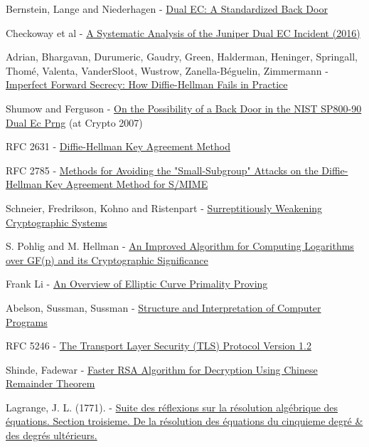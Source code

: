 \documentclass[a4paper,11pt,twocolumn]{article}
\begin{document}
\begin{thebibliography}{1}

 Bernstein, Lange and Niederhagen - \href{https://eprint.iacr.org/2015/767.pdf}{Dual EC: A Standardized Back Door}

 Checkoway et al - \href{http://eprint.iacr.org/2016/376}{A Systematic Analysis of the Juniper Dual EC Incident (2016)}

 Adrian, Bhargavan, Durumeric, Gaudry, Green, Halderman, Heninger, Springall, Thomé, Valenta,  VanderSloot, Wustrow, Zanella-Béguelin, Zimmermann -  \href{https://weakdh.org/imperfect-forward-secrecy-ccs15.pdf}{Imperfect Forward Secrecy: How Diffie-Hellman Fails in Practice}

 Shumow and Ferguson - \href{http://rump2007.cr.yp.to/15-shumow.pdf}{On the Possibility of a Back Door in the NIST SP800-90 Dual Ec Prng} (at Crypto 2007)

 RFC 2631 - \href{https://tools.ietf.org/html/rfc2631}{Diffie-Hellman Key Agreement Method}

 RFC 2785 - \href{https://tools.ietf.org/html/rfc2785}{Methods for Avoiding the "Small-Subgroup" Attacks on the Diffie-Hellman Key Agreement Method for S/MIME}

 Schneier, Fredrikson, Kohno and Ristenpart - \href{https://eprint.iacr.org/2015/097.pdf}{Surreptitiously Weakening Cryptographic Systems}

 S. Pohlig and M. Hellman - \href{http://www-ee.stanford.edu/~hellman/publications/28.pdf}{An Improved Algorithm for Computing Logarithms over GF(p) and its Cryptographic Significance}

 Frank Li - \href{http://theory.stanford.edu/~dfreeman/cs259c-f11/finalpapers/primalityproving.pdf}{An Overview of Elliptic Curve Primality Proving}

 Abelson, Sussman, Sussman -  \href{https://mitpress.mit.edu/sicp/chapter1/footnode.html#2413}{Structure and Interpretation of Computer Programs}

 RFC 5246 - \href{https://www.ietf.org/rfc/rfc5246.txt}{The Transport Layer Security (TLS) Protocol Version 1.2}

 Shinde, Fadewar -  \href{http://www.techscience.com/doi/10.3970/icces.2008.005.255.pdf}{Faster RSA Algorithm for Decryption Using Chinese Remainder Theorem}

 Lagrange, J. L. (1771). - \href{https://books.google.com/books?id=_-U_AAAAYAAJ&pg=PA138#v=onepage&q&f=false}{Suite des réflexions sur la résolution algébrique des équations. Section troisieme. De la résolution des équations du cinquieme degré & des degrés ultérieurs.}

\end{thebibliography}
\end{document}
